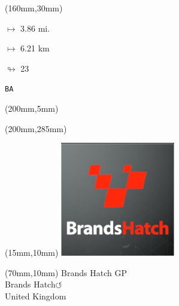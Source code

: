 \begin{textblock*}{40mm}(160mm,30mm)%
\Large
\par$\mapsto$ 3.86 mi.
\par$\mapsto$ 6.21 km
\par$\looparrowright$ 23
\par\hfill\tiny\tt BA\\
\end{textblock*}
\begin{textblock*}{20mm}(200mm,5mm)%
\fbox{\thepage}
\label{BA}
\end{textblock*}
\begin{textblock*}{20mm}(200mm,285mm)%
\fbox{\thepage}
\end{textblock*}

\null\newpage
\begin{textblock*}{50mm}(15mm,10mm)%
\includegraphics[width=50mm]{LG/2015-05-20_00074.png}
\end{textblock*}
\begin{textblock*}{130mm}(70mm,10mm)%
{\fontsize{20}{20}\selectfont Brands Hatch GP\\}
{\fontsize{16}{16}\selectfont Brands Hatch\hfill \huge$\circlearrowleft$\\}
{\fontsize{12}{12}\selectfont United Kingdom\\}
\end{textblock*}
